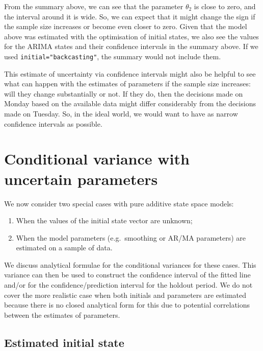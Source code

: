 \documentclass[
]{book}
\providecommand{\tightlist}{%
  \setlength{\itemsep}{0pt}\setlength{\parskip}{0pt}}
\theoremstyle{definition}
\theoremstyle{definition}
\theoremstyle{definition}
\theoremstyle{definition}
\theoremstyle{remark}
\begin{document}
From the summary above, we can see that the parameter \(\theta_2\) is close to zero, and the interval around it is wide. So, we can expect that it might change the sign if the sample size increases or become even closer to zero. Given that the model above was estimated with the optimisation of initial states, we also see the values for the ARIMA states and their confidence intervals in the summary above. If we used \texttt{initial="backcasting"}, the summary would not include them.

This estimate of uncertainty via confidence intervals might also be helpful to see what can happen with the estimates of parameters if the sample size increases: will they change substantially or not. If they do, then the decisions made on Monday based on the available data might differ considerably from the decisions made on Tuesday. So, in the ideal world, we would want to have as narrow confidence intervals as possible.

\hypertarget{conditionalVarianceUncertainty}{%
\section{Conditional variance with uncertain parameters}\label{conditionalVarianceUncertainty}}

We now consider two special cases with pure additive state space models:

\begin{enumerate}
\def\labelenumi{(\arabic{enumi})}
\tightlist
\item
  When the values of the initial state vector are unknown;
\item
  When the model parameters (e.g.~smoothing or AR/MA parameters) are estimated on a sample of data.
\end{enumerate}

We discuss analytical formulae for the conditional variances for these cases. This variance can then be used to construct the confidence interval of the fitted line and/or for the confidence/prediction interval for the holdout period. We do not cover the more realistic case when both initials and parameters are estimated because there is no closed analytical form for this due to potential correlations between the estimates of parameters.

\hypertarget{estimated-initial-state}{%
\subsection{Estimated initial state}\label{estimated-initial-state}}
\end{document}
